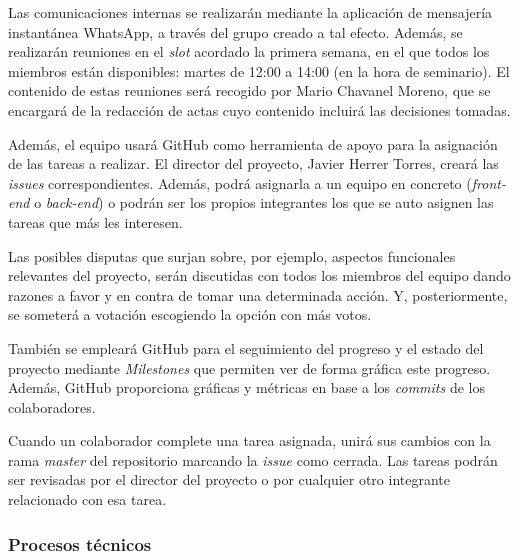 \documentclass{article}
\begin{document}





Las comunicaciones internas se realizarán mediante la aplicación de mensajería instantánea WhatsApp, a través del grupo creado a tal efecto. Además, se realizarán reuniones en el \textit{slot} acordado la primera semana, en el que todos los miembros están disponibles: martes de 12:00 a 14:00 (en la hora de seminario). El contenido de estas reuniones será recogido por Mario Chavanel Moreno, que se encargará de la redacción de actas cuyo contenido incluirá las decisiones tomadas.

Además, el equipo usará GitHub como herramienta de apoyo para la asignación de las tareas a realizar. El director del proyecto, Javier Herrer Torres, creará las \textit{issues} correspondientes. Además, podrá asignarla a un equipo en concreto (\textit{front-end} o \textit{back-end}) o podrán ser los propios integrantes los que se auto asignen las tareas que más les interesen.

Las posibles disputas que surjan sobre, por ejemplo, aspectos funcionales relevantes del proyecto, serán discutidas con todos los miembros del equipo dando razones a favor y en contra de tomar una determinada acción. Y, posteriormente, se someterá a votación escogiendo la opción con más votos.

También se empleará GitHub para el seguimiento del progreso y el estado del proyecto mediante \textit{Milestones} que permiten ver de forma gráfica este progreso. Además, GitHub proporciona gráficas y métricas en base a los \textit{commits} de los colaboradores.

Cuando un colaborador complete una tarea asignada, unirá sus cambios con la rama \textit{master} del repositorio marcando la \textit{issue} como cerrada. Las tareas podrán ser revisadas por el director del proyecto o por cualquier otro integrante relacionado con esa tarea.

\subsubsection{Procesos técnicos}
\end{document}
